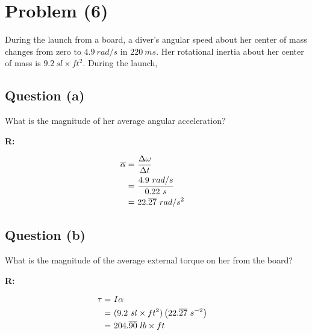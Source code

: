 \section{Problem (6)}
	During the launch from a board, a diver's angular speed about her center of mass changes from zero to $4.9 \ rad/s$ in $220 \ ms$. Her rotational inertia about her center of mass is $9.2 \ sl \times ft^{2}$. During the launch,

	\subsection{Question (a)}

		What is the magnitude of her average angular acceleration?

		\textbf{R:}

		\begin{align}
			\overline{\alpha} = \ &\frac{\Delta \omega}{\Delta t}& \notag \\
			= \ &\frac{4.9 \ rad/s}{0.22 \ s}& \notag \\
			= \ &22.\overline{27} \ rad/s^{2}&
		\end{align}

	\subsection{Question (b)}

		What is the magnitude of the average external torque on her from the board?

		\textbf{R:}

		\begin{align}
			\tau = \ &I \alpha& \notag \\
			= \ &(9.2 \ sl \times ft^{2})\left(22.\overline{27} \ s^{-2}\right)& \notag \\
			= \ &204.\overline{90} \ lb \times ft&
		\end{align}
